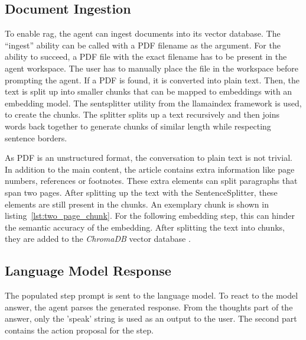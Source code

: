 \documentclass[../main.tex]{subfiles}
\begin{document}
\subsection{Document Ingestion}

To enable \gls{rag},
the agent can ingest documents into its vector database.
The “ingest” ability can be called with a PDF filename as the argument.
For the ability to succeed, a PDF file with the exact filename has to be present
in the agent workspace.
The user has to manually place the file in the workspace before prompting the agent.
If a PDF is found, it is converted into plain text.
Then, the text is split up into smaller chunks that can be mapped to embeddings
with an embedding model.
The \gls{sentsplitter} utility from the \gls{llamaindex} framework \cite{zotero-255} is used,
to create the chunks.
The splitter splits up a text recursively and then joins words back together to
generate chunks of similar length while respecting sentence borders.



As PDF is an unstructured format, the conversation to plain text is not trivial.
In addition to the main content, the article contains extra information like page numbers,
references or footnotes.
These extra elements can split paragraphs that span two pages.
After splitting up the text with the SentenceSplitter, these elements are still
present in the chunks.
An exemplary chunk is shown in listing~\ref{lst:two_page_chunk}.
For the following embedding step,
this can hinder the semantic accuracy of the embedding.
After splitting the text into chunks, they are added to the \emph{ChromaDB}
vector database \cite{zotero-176}.

\subsection{Language Model Response}

The populated step prompt is sent to the language model.
To react to the model answer, the agent parses the generated response.
From the thoughts part of the answer, only the 'speak' string is used as an output to the user.
The second part contains the action proposal for the step.
\end{document}
